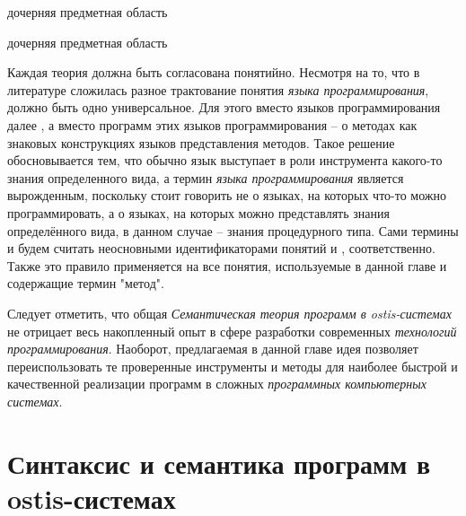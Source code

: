 \begin{SCn}
\begin{scnrelfromlist}{дочерняя предметная область}
    \begin{scnindent}
        \begin{scnrelfromlist}{дочерняя предметная область}
        \end{scnrelfromlist}
    \end{scnindent}
\end{scnrelfromlist}
\end{SCn}

Каждая теория должна быть согласована понятийно. Несмотря на то, что в литературе сложилась разное трактование понятия \textit{языка программирования}, должно быть одно универсальное. Для этого вместо языков программирования далее , а вместо программ этих языков программирования -- о методах как знаковых конструкциях языков представления методов. Такое решение обосновывается тем, что обычно язык выступает в роли инструмента какого-то знания определенного вида, а термин \textit{языка программирования} является вырожденным, поскольку стоит говорить не о языках, на которых что-то можно программировать, а о языках, на которых можно представлять знания определённого вида, в данном случае -- знания процедурного типа. Сами термины  и  будем считать неосновными идентификаторами понятий  и , соответственно. Также это правило применяется на все понятия, используемые в данной главе и содержащие термин "метод".

Следует отметить, что общая \textit{Семантическая теория программ в ostis-системах} не отрицает весь накопленный опыт в сфере разработки современных \textit{технологий программирования}. Наоборот, предлагаемая в данной главе идея позволяет переиспользовать те проверенные инструменты и методы для наиболее быстрой и качественной реализации программ в сложных \textit{программных компьютерных системах}.

\section{Синтаксис и семантика программ в ostis-системах}
\label{sec_programs_method_syntax_and_semantic}

